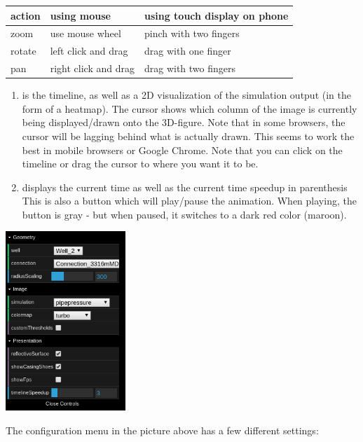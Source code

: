 \begin{longtable}[]{@{}lll@{}}
\toprule
action & using mouse & using touch display on phone\tabularnewline
\midrule
\endhead
zoom & use mouse wheel & pinch with two fingers\tabularnewline
rotate & left click and drag & drag with one finger\tabularnewline
pan & right click and drag & drag with two fingers\tabularnewline
\bottomrule
\end{longtable}

\begin{enumerate}
\def\labelenumi{\arabic{enumi}.}
\setcounter{enumi}{2}
\item
  is the timeline, as well as a 2D visualization of the simulation
  output (in the form of a heatmap). The cursor shows which column of
  the image is currently being displayed/drawn onto the 3D-figure. Note
  that in some browsers, the cursor will be lagging behind what is
  actually drawn. This seems to work the best in mobile browsers or
  Google Chrome. Note that you can click on the timeline or drag the
  cursor to where you want it to be.
\item
  displays the current time as well as the current time speedup in
  parenthesis This is also a button which will play/pause the animation.
  When playing, the button is gray - but when paused, it switches to a
  dark red color (maroon).
\end{enumerate}

\includegraphics[width=\textwidth,height=2.66667in]{./config.png}

The configuration menu in the picture above has a few different
settings:

